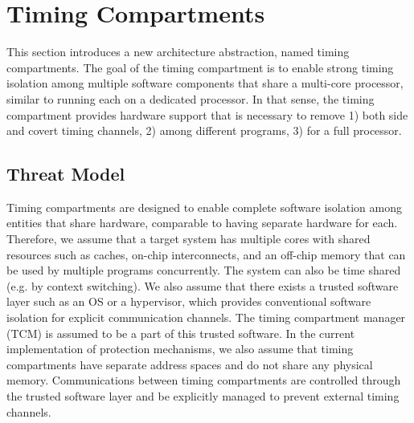 \section{Timing Compartments}

This section introduces a new architecture abstraction, named timing 
compartments.
The goal of the timing compartment is to enable strong timing isolation
among multiple software components that share a multi-core processor,
similar to running each on a dedicated processor.
In that sense, the timing compartment provides hardware support that is 
necessary to remove 1) both side and covert timing channels, 2) among
different programs, 3) for a full processor.


\subsection{Threat Model}

Timing compartments are designed to enable complete software isolation among
entities that share hardware, comparable to having separate hardware for each.
Therefore, we assume that a target system has multiple cores with shared
resources such as caches, on-chip interconnects, and an off-chip memory that can
be used by multiple programs concurrently. The system can also be time shared 
(e.g. by context switching).
We also assume that there exists a trusted software layer such as an OS or a 
hypervisor,
which provides conventional software isolation for explicit communication 
channels.
The timing compartment manager (TCM) is assumed to be a part of this trusted 
software.
In the current implementation of protection mechanisms, we also assume that
timing compartments have separate address spaces and do not share any physical
memory. Communications between timing compartments are controlled through the 
trusted
software layer and be explicitly managed to prevent external timing channels. 

